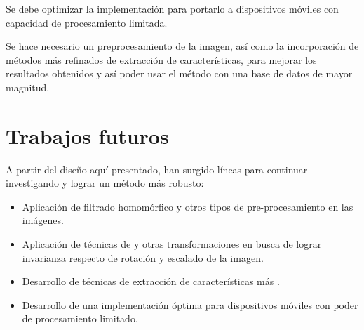 \documentclass[conference,a4paper,10pt,oneside,final]{tfmpd}
\begin{document}
Se debe optimizar la implementación para portarlo a dispositivos móviles
con capacidad de procesamiento limitada.

Se hace necesario un preprocesamiento de la imagen, así como la incorporación
de métodos más refinados de extracción de características, para mejorar los
resultados obtenidos y así poder usar el método con una base de datos de
mayor magnitud.
%
%
%
%
\section{Trabajos futuros}
A partir del diseño aquí presentado, han surgido líneas para continuar
investigando y lograr un método más robusto:
\begin{itemize}
\item Aplicación de filtrado homomórfico y otros tipos de
      pre-procesamiento en las imágenes.
\item Aplicación de técnicas de  y otras transformaciones en busca
      de lograr invarianza respecto de rotación y escalado de la imagen.
\item Desarrollo de técnicas de extracción de características más
      .
\item Desarrollo de una implementación óptima para dispositivos móviles con
      poder de procesamiento limitado.
\end{itemize}
\nocite{*}


\end{document}

